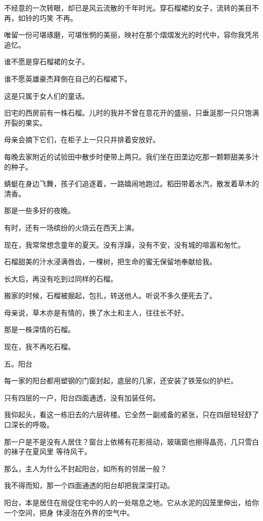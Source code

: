 \documentclass[12pt,a4paper]{article}
\def\blankrev{\vspace{1ex}}									%
\newcommand{\subpart}[1]{
	\begingroup \par
	\vspace{1ex} \centering #1
	\par \endgroup
}
\begin{document}
		不经意的一次转眼，却已是风云流散的千年时光。穿石榴裙的女子，流转的美目不再，如铃的巧笑
	不再。

		唯留一份可堪琢磨，可堪怅惘的美丽，映衬在那个熠熠发光的时代中，容你我凭吊追忆。\par
		谁不愿是穿石榴裙的女子。\par
		谁不愿英雄豪杰拜倒在自己的石榴裙下。\par
		这是只属于女人们的童话。

		\blankrev
		旧宅的西房前有一株石榴。儿时的我并不曾在意花开的盛丽，只垂涎那一只只饱满开裂的果实。\par
		母亲会摘下它们，在柜子上一只只并排着安放好。\par
		每晚去家附近的试验田中散步时便带上两只。我们坐在田垄边吃那一颗颗甜美多汁的种子。\par
		蜻蜓在身边飞舞，孩子们追逐着，一路嬉闹地跑过。稻田带着水汽，散发着草木的清香。\par
		那是一些多好的夜晚。\par
		有时，还有一场缤纷的火烧云在西天上演。\par
		现在，我常常想念童年的夏天。没有浮躁，没有不安，没有城的喧嚣和匆忙。\par
		石榴甜美的汁水浸满唇齿，一棵树，把生命的蜜无保留地奉献给我。\par
		长大后，再没有吃到过同样的石榴。\par
		搬家的时候，石榴被掘起，包扎，转送他人。听说不多久便死去了。\par
		母亲说，草木亦是有情的，换了水土和主人，往往长不好。\par
		那是一株深情的石榴。\par
		现在，我不再吃石榴。


		\subpart{五。阳台}

		每一家的阳台都用塑钢的门窗封起，底层的几家，还安装了铁笼似的护栏。\par
		只有四层的一户，阳台四面通透，没有加装任何。\par
		我仰起头，看这一栋旧去的六层砖楼。它全然一副戒备的紧张，只在四层轻轻舒了口深长的呼吸。

		那一户是不是没有人居住？窗台上依稀有花影摇动，玻璃窗也擦得晶亮，几只雪白的袜子在夏风里
	等待风干。

		那么，主人为什么不封起阳台，如所有的邻居一般？\par
		我不得而知，那一个四面通透的阳台却把我深深打动。

		阳台，本是居住在局促住宅中的人的一处喘息之地。它从水泥的囚笼里伸出，给你一个空间，把身
	体浸泡在外界的空气中。
\end{document}
